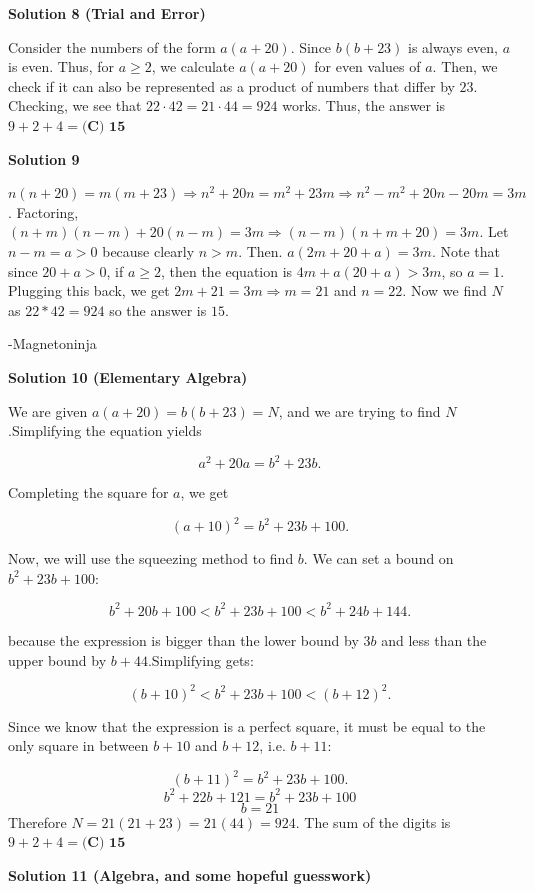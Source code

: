 \begin{enumerate}
\textbf{Solution 8 (Trial and Error)}

Consider the numbers of the form $a(a+20)$. Since $b(b+23)$ is always even, $a$ is even. Thus, for $a \ge 2$, we calculate $a(a+20)$ for even values of $a$. Then, we check if it can also be represented as a product of numbers that differ by $23$. Checking, we see that $22 \cdot 42 = 21 \cdot 44 = 924$ works. Thus, the answer is $9 + 2 + 4 = \boxed{\textbf{(C) 15}}$




\textbf{Solution 9}

$n(n+20)=m(m+23) \Longrightarrow n^2+20n=m^2+23m \Longrightarrow n^2-m^2+20n-20m=3m$. Factoring, $(n+m)(n-m)+20(n-m)=3m \Longrightarrow (n-m)(n+m+20)=3m$. Let $n-m=a>0$ because clearly $n>m$. Then. $a(2m+20+a)=3m$. Note that since $20+a>0$, if $a\geq2$, then the equation is $4m+a(20+a)>3m$, so $a=1$. Plugging this back, we get $2m+21=3m \Longrightarrow m=21$ and $n=22$. Now we find $N$ as $22*42=924$ so the answer is $15$.

 -Magnetoninja

 



\textbf{Solution 10 (Elementary Algebra)}

We are given $a(a+20) = b(b+23) = N$, and we are trying to find $N$.Simplifying the equation yields

 
 \[a^2+20a=b^2+23b.\]

 Completing the square for $a$, we get

 
 \[(a+10)^2=b^2+23b+100.\]

 Now, we will use the squeezing method to find $b$. We can set a bound on $b^2+23b+100$: 

 
 \[b^2+20b+100<b^2+23b+100<b^2+24b+144.\]

 because the expression is bigger than the lower bound by $3b$ and less than the upper bound by $b+44$.Simplifying gets:

 
 \[(b+10)^2<b^2+23b+100<(b+12)^2.\]

 Since we know that the expression is a perfect square, it must be equal to the only square in between $b+10$ and $b+12$, i.e. $b+11$:

 
 \[(b+11)^2=b^2+23b+100.\]
 \[b^2+22b+121=b^2+23b+100\]
 \[b=21\]Therefore $N=21(21+23)=21(44)=924.$ The sum of the digits is $9+2+4=\boxed{\textbf{(C) 15}}$




\textbf{Solution 11 (Algebra, and some hopeful guesswork)}


\end{enumerate}

